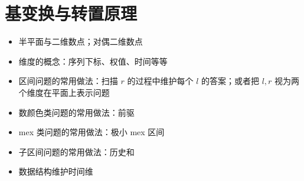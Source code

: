 \chapter{基变换与转置原理}



\begin{summary}
    \begin{itemize}
        \item 半平面与二维数点；对偶二维数点
        \item 维度的概念：序列下标、权值、时间等等
        \item 区间问题的常用做法：扫描 $r$ 的过程中维护每个 $l$ 的答案；或者把 $l,r$ 视为两个维度在平面上表示问题
        \item 数颜色类问题的常用做法：前驱
        \item mex 类问题的常用做法：极小 mex 区间
        \item 子区间问题的常用做法：历史和
        \item 数据结构维护时间维
    \end{itemize}
\end{summary}